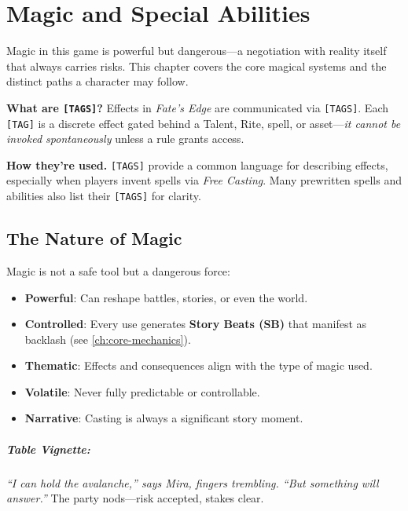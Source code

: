 \chapter{Magic and Special Abilities}
\label{ch:magic}

Magic in this game is powerful but dangerous—a negotiation with reality itself that always carries risks. This chapter covers the core magical systems and the distinct paths a character may follow.

\begin{tcolorbox}[colback=black!3,colframe=black!40!white,title={Sidebar: \texttt{[TAGS]} \& Magic},enhanced]
  \textbf{What are \texttt{[TAGS]}?} Effects in \textit{Fate's Edge} are communicated via \texttt{[TAGS]}. Each \texttt{[TAG]} is a discrete effect gated behind a Talent, Rite, spell, or asset—\emph{it cannot be invoked spontaneously} unless a rule grants access.
  
  \medskip
  \textbf{How they’re used.} \texttt{[TAGS]} provide a common language for describing effects, especially when players invent spells via \emph{Free Casting}. Many prewritten spells and abilities also list their \texttt{[TAGS]} for clarity.
\end{tcolorbox}

\section{The Nature of Magic}
\label{sec:magic-nature}

Magic is not a safe tool but a dangerous force:
\begin{itemize}
\item \textbf{Powerful}: Can reshape battles, stories, or even the world.
\item \textbf{Controlled}: Every use generates \textbf{Story Beats (SB)} that manifest as backlash (see \ref{ch:core-mechanics}).
\item \textbf{Thematic}: Effects and consequences align with the type of magic used.
\item \textbf{Volatile}: Never fully predictable or controllable.
\item \textbf{Narrative}: Casting is always a significant story moment.
\end{itemize}

\paragraph{Table Vignette:}
\emph{``I can hold the avalanche,'' says Mira, fingers trembling. ``But something will answer.''} The party nods—risk accepted, stakes clear.

